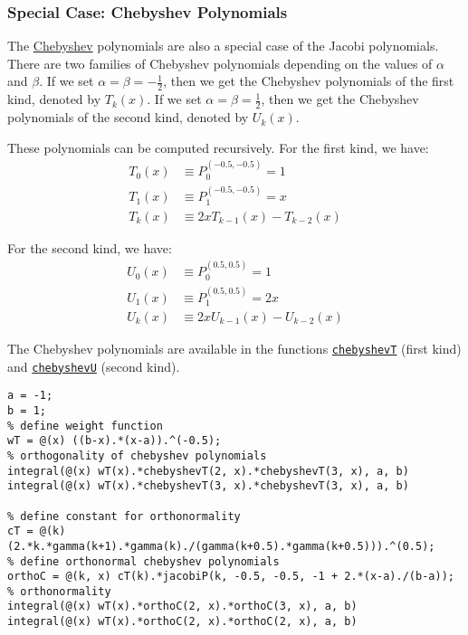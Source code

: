 \documentclass[12pt, a4paper]{article}
\begin{document}
\subsubsection{Special Case: Chebyshev Polynomials}
\label{sec:org5be0814}
The \href{https://en.wikipedia.org/wiki/Chebyshev\_polynomials}{Chebyshev} polynomials are also a special case of the Jacobi polynomials.
There are two families of Chebyshev polynomials depending on the values of \(\alpha\) and \(\beta\).
If we set \(\alpha=\beta=-\frac{1}{2}\), then we get the Chebyshev polynomials of the first kind, denoted by \(T_k(x)\).
If we set \(\alpha=\beta=\frac{1}{2}\), then we get the Chebyshev polynomials of the second kind, denoted by \(U_k(x)\).

These polynomials can be computed recursively.
For the first kind, we have:
\begin{align*}
T_0(x)&\equiv P_0^{(-0.5, -0.5)}=1\\
T_1(x)&\equiv P_1^{(-0.5, -0.5)}=x\\
T_k(x)&\equiv 2xT_{k-1}(x)-T_{k-2}(x)
\end{align*}

For the second kind, we have:
\begin{align*}
U_0(x)&\equiv P_0^{(0.5, 0.5)}=1\\
U_1(x)&\equiv P_1^{(0.5, 0.5)}=2x\\
U_k(x)&\equiv 2xU_{k-1}(x)-U_{k-2}(x)
\end{align*}

The Chebyshev polynomials are available in the functions \href{https://www.mathworks.com/help/symbolic/chebyshevt.html}{\texttt{chebyshevT}} (first kind) and \href{https://www.mathworks.com/help/symbolic/chebyshevu.html?s\_tid=doc\_ta}{\texttt{chebyshevU}} (second kind).
\lstset{language=matlab,label= ,caption= ,captionpos=b,firstnumber=1,numbers=left,style=Matlab-editor}
\begin{lstlisting}
a = -1;
b = 1;
% define weight function
wT = @(x) ((b-x).*(x-a)).^(-0.5);
% orthogonality of chebyshev polynomials
integral(@(x) wT(x).*chebyshevT(2, x).*chebyshevT(3, x), a, b)
integral(@(x) wT(x).*chebyshevT(3, x).*chebyshevT(3, x), a, b)

% define constant for orthonormality
cT = @(k) (2.*k.*gamma(k+1).*gamma(k)./(gamma(k+0.5).*gamma(k+0.5))).^(0.5);
% define orthonormal chebyshev polynomials
orthoC = @(k, x) cT(k).*jacobiP(k, -0.5, -0.5, -1 + 2.*(x-a)./(b-a));
% orthonormality
integral(@(x) wT(x).*orthoC(2, x).*orthoC(3, x), a, b)
integral(@(x) wT(x).*orthoC(2, x).*orthoC(2, x), a, b)
\end{lstlisting}
\end{document}
